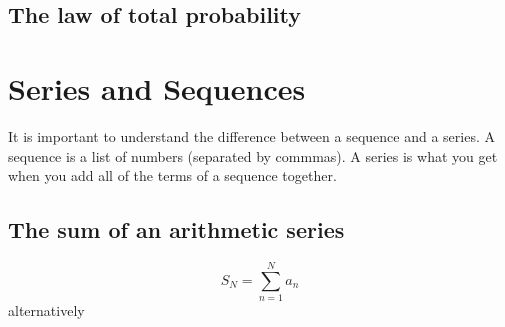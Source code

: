 \documentclass{article}
\begin{document}
\subsection{The law of total probability}

\section{Series and Sequences}
It is important to understand the difference between a sequence and a series.
A sequence is a list of numbers (separated by commmas).
A series is what you get when you add all of the terms of a sequence together.
\subsection{The sum of an arithmetic series}
\begin{equation}
  S_N = \sum^N_{n=1}a_n
\end{equation}
alternatively
\end{document}
